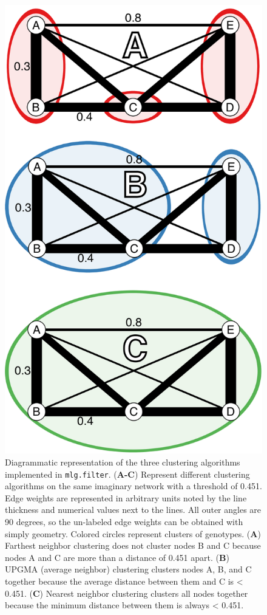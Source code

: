 \documentclass[double,12pt]{beavtex}
\begin{document}
  \begin{figure}
  
  {\centering \includegraphics[width=0.5\linewidth]{figure/frontiers/Figure-1} 
  
  }
  
  \caption[Diagrammatic representation of the three clustering algorithms
  implemented in \texttt{mlg.filter}.]{Diagrammatic representation of the three clustering algorithms
  implemented in \texttt{mlg.filter}. (\textbf{A-C}) Represent different
  clustering algorithms on the same imaginary network with a threshold of
  0.451. Edge weights are represented in arbitrary units noted by the line
  thickness and numerical values next to the lines. All outer angles are
  90 degrees, so the un-labeled edge weights can be obtained with simply
  geometry. Colored circles represent clusters of genotypes. (\textbf{A})
  Farthest neighbor clustering does not cluster nodes B and C because
  nodes A and C are more than a distance of 0.451 apart. (\textbf{B})
  UPGMA (average neighbor) clustering clusters nodes A, B, and C together
  because the average distance between them and C is \textless{} 0.451.
  (\textbf{C}) Nearest neighbor clustering clusters all nodes together
  because the minimum distance between them is always \textless{} 0.451.}\label{fig:Figure1}
  \end{figure}
  
\end{document}
